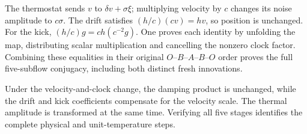 \documentclass[11pt,a4paper]{report}
\begin{document}
The thermostat sends \(v\) to \(\delta v+\sigma\xi\); multiplying velocity by \(c\) changes its noise amplitude to \(c\sigma\). The drift satisfies \((h/c)(cv)=hv\), so position is unchanged. For the kick, \((h/c)g=c h(c^{-2}g)\). One proves each identity by unfolding the map, distributing scalar multiplication and cancelling the nonzero clock factor. Combining these equalities in their original \(O\)–\(B\)–\(A\)–\(B\)–\(O\) order proves the full five-subflow conjugacy, including both distinct fresh innovations.



Under the velocity-and-clock change, the damping product is unchanged, while the drift and kick coefficients compensate for the velocity scale. The thermal amplitude is transformed at the same time. Verifying all five stages identifies the complete physical and unit-temperature steps.
\end{document}
